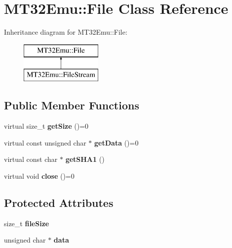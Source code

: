 \hypertarget{classMT32Emu_1_1File}{\section{M\-T32\-Emu\-:\-:File Class Reference}
\label{classMT32Emu_1_1File}
}
Inheritance diagram for M\-T32\-Emu\-:\-:File\-:\begin{figure}[H]
\begin{center}
\leavevmode
\includegraphics[height=2.000000cm]{classMT32Emu_1_1File}
\end{center}
\end{figure}
\subsection*{Public Member Functions}
\begin{DoxyCompactItemize}
\item 
\hypertarget{classMT32Emu_1_1File_aaa146c0d19d329b4ff9c06ee6d0dbd73}{virtual size\-\_\-t {\bfseries get\-Size} ()=0}\label{classMT32Emu_1_1File_aaa146c0d19d329b4ff9c06ee6d0dbd73}

\item 
\hypertarget{classMT32Emu_1_1File_a5091363b8a5a5a53e68b977755a87be0}{virtual const unsigned char $\ast$ {\bfseries get\-Data} ()=0}\label{classMT32Emu_1_1File_a5091363b8a5a5a53e68b977755a87be0}

\item 
\hypertarget{classMT32Emu_1_1File_a5318649105e361559051433549bf948e}{virtual const char $\ast$ {\bfseries get\-S\-H\-A1} ()}\label{classMT32Emu_1_1File_a5318649105e361559051433549bf948e}

\item 
\hypertarget{classMT32Emu_1_1File_a367444fa6dd030d3c554d0243c3abcce}{virtual void {\bfseries close} ()=0}\label{classMT32Emu_1_1File_a367444fa6dd030d3c554d0243c3abcce}

\end{DoxyCompactItemize}
\subsection*{Protected Attributes}
\begin{DoxyCompactItemize}
\item 
\hypertarget{classMT32Emu_1_1File_a105dccc7c2a015996253f9e33bc45784}{size\-\_\-t {\bfseries file\-Size}}\label{classMT32Emu_1_1File_a105dccc7c2a015996253f9e33bc45784}

\item 
\hypertarget{classMT32Emu_1_1File_a88a9612463756d7eadf09bb25301d860}{unsigned char $\ast$ {\bfseries data}}\label{classMT32Emu_1_1File_a88a9612463756d7eadf09bb25301d860}

\end{DoxyCompactItemize}


